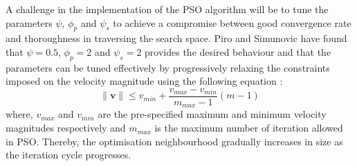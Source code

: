 	A challenge in the implementation of the PSO algorithm will be to tune the parameters $\psi$, $\phi_p$ and $\psi_s$ to achieve a compromise between good convergence rate and thoroughness in traversing the search space. Piro and Simunovic \cite{Piro16} have found that $\psi=0.5$, $\phi_p=2$ and $\psi_s=2$ provides the desired behaviour and that the parameters can be tuned effectively by progressively relaxing the constraints imposed on the velocity magnitude using the following equation \cite{Nocedal06}:
	\begin{equation}\label{eq:PSOvel}
		\|\mathbf{v}\| \leq v_{min} + \frac{v_{max}-v_{min}}{m_{max} - 1} (m-1)
	\end{equation}
	where, $v_{max}$ and $v_{min}$ are the pre-specified maximum and minimum velocity magnitudes respectively and $m_{max}$ is the maximum number of iteration allowed in PSO. Thereby, the optimisation neighbourhood gradually increases in size as the iteration cycle progresses. 
 	 	
